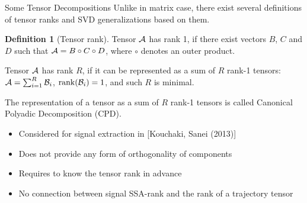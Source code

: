 \documentclass[pdf, unicode, ucs, notheorems]{beamer}
\newcommand{\bluetext}[1]{{\usebeamercolor[fg]{bluetext_color}#1}}
\theoremstyle{definition}
\newtheorem{definition}{Definition}
\begin{document}
\begin{frame}{Some Tensor Decompositions}
  Unlike in matrix case, there exist several definitions of tensor ranks and
  SVD generalizations based on them.

  \begin{definition}[Tensor rank]
    Tensor $\mathcal{A}$ has rank 1, if there exist vectors $B$, $C$ and $D$ such that
    $\mathcal{A}=B \circ C \circ D$, where $\circ$ denotes an outer
    product.\\ \medskip

    Tensor $\mathcal{A}$ has rank $R$, if it can be represented as a sum of
    $R$ rank-1 tensors: $\mathcal{A} = \sum_{i=1}^{R} \mathcal{B}_i$,
    $\operatorname{rank}(\mathcal{B}_i)=1$, and such $R$ is minimal.
  \end{definition}

  \medskip

  The representation of a tensor as a sum of $R$ rank-1 tensors is called
  \bluetext{Canonical Polyadic Decomposition (CPD)}.

  \smallskip

  \begin{itemize}
    \item Considered for signal extraction in [Kouchaki, Sanei (2013)]
    \item Does not provide any form of orthogonality of components
    \item Requires to know the tensor rank in advance
    \item No connection between signal SSA-rank and the rank of a
      trajectory tensor
  \end{itemize}
\end{frame}
\end{document}
